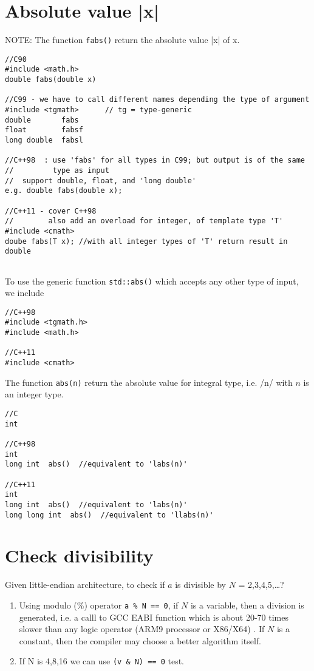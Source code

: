 \section{Absolute value |x|}

NOTE: The function \verb!fabs()! return the absolute value |x| of x.
\begin{verbatim}
//C90
#include <math.h>
double fabs(double x)

//C99 - we have to call different names depending the type of argument
#include <tgmath>      // tg = type-generic
double       fabs
float        fabsf
long double  fabsl

//C++98  : use 'fabs' for all types in C99; but output is of the same
//         type as input
//  support double, float, and 'long double'
e.g. double fabs(double x);

//C++11 - cover C++98
//        also add an overload for integer, of template type 'T'
#include <cmath>
doube fabs(T x); //with all integer types of 'T' return result in double


\end{verbatim}


To use the generic function \verb!std::abs()! which accepts any other type of
input, we include
\begin{verbatim}
//C++98
#include <tgmath.h>
#include <math.h>

//C++11
#include <cmath>
\end{verbatim}

The function \verb!abs(n)! return the absolute value for integral type, i.e.
/n/ with $n$ is an integer type.
\begin{verbatim}
//C
int

//C++98
int
long int  abs()  //equivalent to 'labs(n)'

//C++11
int
long int  abs()  //equivalent to 'labs(n)'
long long int  abs()  //equivalent to 'llabs(n)'
\end{verbatim}


\section{Check divisibility}

Given little-endian architecture, to check if $a$ is divisible by $N$ =
2,3,4,5,\ldots?
\begin{enumerate}
  \item Using modulo (\%) operator \verb!a % N == 0!, if $N$ is a variable, then
  a division is generated, i.e. a calll to GCC EABI function which is about
  20-70 times slower than any logic operator  (ARM9 processor or X86/X64)
  \citep{granlund2012}. If $N$ is a constant, then  the compiler may choose a
  better algorithm itself. 
  
  \item If N is 4,8,16 we can use \verb!(v & N) == 0! test.
  
\end{enumerate}

